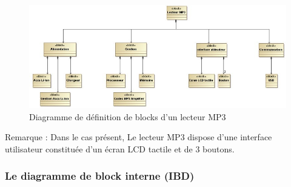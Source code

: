 \documentclass[12pt,a4paper]{report}
\begin{document}
\begin{figure}[H]
	\centering
	\includegraphics[width=0.8\linewidth]{image12.png}
	\caption{Diagramme de d\'{e}finition de blocks d'un lecteur MP3}
	
\end{figure}

\noindent \begin{flushleft}
	
	
	\noindent Remarque : Dans le cas pr\'{e}sent, Le lecteur MP3 dispose d'une interface utilisateur constitu\'{e}e d'un \'{e}cran LCD tactile et de 3 boutons.
\end{flushleft}


\subsubsection{ Le diagramme de block interne (IBD)}
\end{document}
